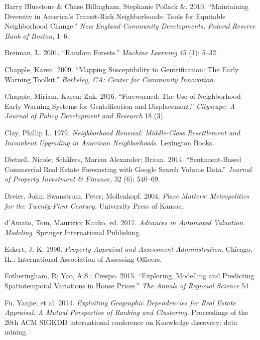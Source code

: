 \documentclass[]{article}
\begin{document}
\hypertarget{ref-Pollack2010}{}
Barry Bluestone \& Chase Billingham, Stephanie Pollack \&. 2010.
``Maintaining Diversity in America's Transit-Rich Neighborhoods: Tools
for Equitable Neighborhood Change.'' \emph{New England Community
Developments, Federal Reserve Bank of Boston}, 1--6.

\hypertarget{ref-Breiman2001}{}
Breiman, L. 2001. ``Random Forests.'' \emph{Machine Learning} 45 (1):
5--32.

\hypertarget{ref-Chapple2009}{}
Chapple, Karen. 2009. ``Mapping Susceptibility to Gentrification: The
Early Warning Toolkit.'' \emph{Berkeley, CA: Center for Community
Innovation.}

\hypertarget{ref-Chapple2016}{}
Chapple, Miriam, Karen; Zuk. 2016. ``Forewarned: The Use of Neighborhood
Early Warning Systems for Gentrification and Displacement.''
\emph{Cityscape: A Journal of Policy Development and Research} 18 (3).

\hypertarget{ref-Clay1979}{}
Clay, Phillip L. 1979. \emph{Neighborhood Renewal: Middle-Class
Resettlement and Incumbent Upgrading in American Neighborhoods}.
Lexington Books.

\hypertarget{ref-Dietzell2014}{}
Dietzell, Nicole; Schäfers, Marian Alexander; Braun. 2014.
``Sentiment-Based Commercial Real Estate Forecasting with Google Search
Volume Data.'' \emph{Journal of Property Investment \& Finance,} 32 (6):
540--69.

\hypertarget{ref-Dreier2004}{}
Dreier, John; Swanstrom, Peter; Mollenkopf. 2004. \emph{Place Matters:
Metropolitics for the Twenty-First Century.} University Press of Kansas.

\hypertarget{ref-Springer2017}{}
d'Amato, Tom, Maurizio; Kauko, ed. 2017. \emph{Advances in Automated
Valuation Modeling}. Springer International Publishing.

\hypertarget{ref-Eckert1990}{}
Eckert, J. K. 1990. \emph{Property Appraisal and Assessment
Administration}. Chicago, IL.: International Association of Assessing
Officers.

\hypertarget{ref-Fotheringham2015}{}
Fotheringham, R; Yao, A.S.; Crespo. 2015. ``Exploring, Modelling and
Predicting Spatiotemporal Variations in House Prices.'' \emph{The Annals
of Regional Science} 54.

\hypertarget{ref-Fu2014}{}
Fu, Yanjie; et al. 2014. \emph{Exploiting Geographic Dependencies for
Real Estate Appraisal: A Mutual Perspective of Ranking and Clustering}.
Proceedings of the 20th ACM SIGKDD international conference on Knowledge
discovery; data mining.
\end{document}
